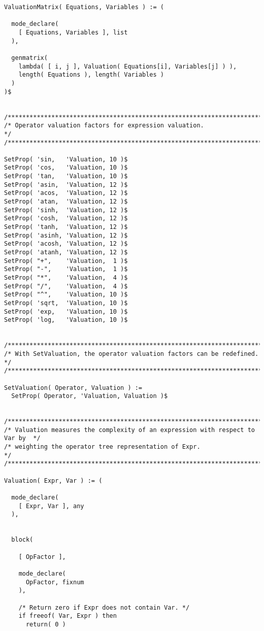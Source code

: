 \begin{verbatim}
ValuationMatrix( Equations, Variables ) := (

  mode_declare(
    [ Equations, Variables ], list
  ),

  genmatrix(
    lambda( [ i, j ], Valuation( Equations[i], Variables[j] ) ),
    length( Equations ), length( Variables )
  )
)$


/******************************************************************************/
/* Operator valuation factors for expression valuation.                       */
/******************************************************************************/

SetProp( 'sin,   'Valuation, 10 )$
SetProp( 'cos,   'Valuation, 10 )$
SetProp( 'tan,   'Valuation, 10 )$
SetProp( 'asin,  'Valuation, 12 )$
SetProp( 'acos,  'Valuation, 12 )$
SetProp( 'atan,  'Valuation, 12 )$
SetProp( 'sinh,  'Valuation, 12 )$
SetProp( 'cosh,  'Valuation, 12 )$
SetProp( 'tanh,  'Valuation, 12 )$
SetProp( 'asinh, 'Valuation, 12 )$
SetProp( 'acosh, 'Valuation, 12 )$
SetProp( 'atanh, 'Valuation, 12 )$
SetProp( "+",    'Valuation,  1 )$
SetProp( "-",    'Valuation,  1 )$
SetProp( "*",    'Valuation,  4 )$
SetProp( "/",    'Valuation,  4 )$
SetProp( "^",    'Valuation, 10 )$
SetProp( 'sqrt,  'Valuation, 10 )$
SetProp( 'exp,   'Valuation, 10 )$
SetProp( 'log,   'Valuation, 10 )$


/******************************************************************************/
/* With SetValuation, the operator valuation factors can be redefined.        */
/******************************************************************************/

SetValuation( Operator, Valuation ) :=
  SetProp( Operator, 'Valuation, Valuation )$
  

/******************************************************************************/
/* Valuation measures the complexity of an expression with respect to Var by  */
/* weighting the operator tree representation of Expr.                        */
/******************************************************************************/

Valuation( Expr, Var ) := (

  mode_declare(
    [ Expr, Var ], any
  ),


  block(

    [ OpFactor ],

    mode_declare(
      OpFactor, fixnum
    ),

    /* Return zero if Expr does not contain Var. */
    if freeof( Var, Expr ) then
      return( 0 )


\end{verbatim}
